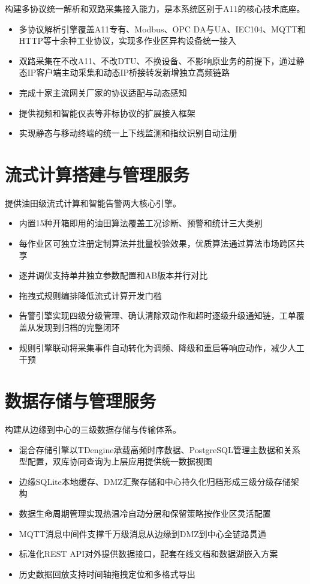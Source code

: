 \documentclass[11pt,a4paper]{ctexart}
\begin{document}
构建多协议统一解析和双路采集接入能力，是本系统区别于A11的核心技术底座。

\begin{itemize}[leftmargin=*]
  \item 多协议解析引擎覆盖A11专有、Modbus、OPC DA与UA、IEC104、MQTT和HTTP等十余种工业协议，实现多作业区异构设备统一接入
  \item 双路采集在不改A11、不改DTU、不换设备、不影响原业务的前提下，通过静态IP客户端主动采集和动态IP桥接转发新增独立高频链路
  \item 完成十家主流网关厂家的协议适配与动态感知
  \item 提供视频和智能仪表等非标协议的扩展接入框架
  \item 实现静态与移动终端的统一上下线监测和指纹识别自动注册
\end{itemize}

\section{流式计算搭建与管理服务}

提供油田级流式计算和智能告警两大核心引擎。

\begin{itemize}[leftmargin=*]
  \item 内置15种开箱即用的油田算法覆盖工况诊断、预警和统计三大类别
  \item 每作业区可独立注册定制算法并批量校验效果，优质算法通过算法市场跨区共享
  \item 逐井调优支持单井独立参数配置和AB版本并行对比
  \item 拖拽式规则编排降低流式计算开发门槛
  \item 告警引擎实现四级分级管理、确认清除双动作和超时逐级升级通知链，工单覆盖从发现到归档的完整闭环
  \item 规则引擎联动将采集事件自动转化为调频、降级和重启等响应动作，减少人工干预
\end{itemize}

\section{数据存储与管理服务}

构建从边缘到中心的三级数据存储与传输体系。

\begin{itemize}[leftmargin=*]
  \item 混合存储引擎以TDengine承载高频时序数据、PostgreSQL管理主数据和关系型配置，双库协同查询为上层应用提供统一数据视图
  \item 边缘SQLite本地缓存、DMZ汇聚存储和中心持久化归档形成三级分级存储架构
  \item 数据生命周期管理实现热温冷自动分层和保留策略按作业区灵活配置
  \item MQTT消息中间件支撑千万级消息从边缘到DMZ到中心全链路贯通
  \item 标准化REST API对外提供数据接口，配套在线文档和数据湖嵌入方案
  \item 历史数据回放支持时间轴拖拽定位和多格式导出
\end{itemize}
\end{document}
